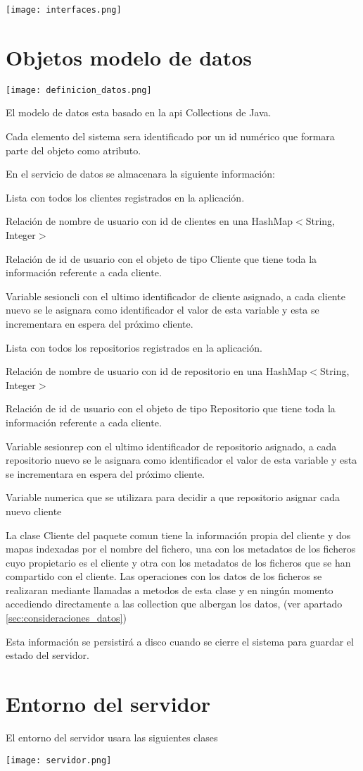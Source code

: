 \texttt{[image: interfaces.png]}

\section{Objetos modelo de datos}
\texttt{[image: definicion\_datos.png]}

El modelo de datos esta basado en la api Collections de Java.

Cada elemento del sistema sera identificado por un id numérico que formara parte del objeto como atributo.

En el servicio de datos se almacenara la siguiente información:
\begin{compactitem}
\item Lista con todos los clientes registrados en la aplicación.
\item Relación de nombre de usuario con id de clientes en una HashMap$<$String, Integer$>$
\item Relación de id de usuario con el objeto de tipo Cliente que tiene toda la información referente a cada cliente.
\item Variable sesioncli con el ultimo identificador de cliente asignado, a cada cliente nuevo se le asignara como identificador el valor de esta variable y esta se incrementara en espera del próximo cliente.
\item Lista con todos los repositorios registrados en la aplicación.
\item Relación de nombre de usuario con id de repositorio en una HashMap$<$String, Integer$>$
\item Relación de id de usuario con el objeto de tipo Repositorio que tiene toda la información referente a cada cliente.
\item Variable sesionrep con el ultimo identificador de repositorio asignado, a cada repositorio nuevo se le asignara como identificador el valor de esta variable y esta se incrementara en espera del próximo cliente.
\item Variable numerica que se utilizara para decidir a que repositorio asignar cada nuevo cliente
\end{compactitem}

La clase Cliente del paquete comun tiene la información propia del cliente y dos mapas indexadas por el nombre del fichero, una con los metadatos de los ficheros cuyo propietario es el cliente y otra con los metadatos de los ficheros que se han compartido con el cliente. Las operaciones con los datos de los ficheros se realizaran mediante llamadas a metodos de esta clase y en ningún momento accediendo directamente a las collection que albergan los datos, (ver apartado \ref{sec:consideraciones_datos})

Esta información se persistirá a disco cuando se cierre el sistema para guardar el estado del servidor.

\section{Entorno del servidor}

El entorno del servidor usara las siguientes clases

\centerline{\texttt{[image: servidor.png]}}

